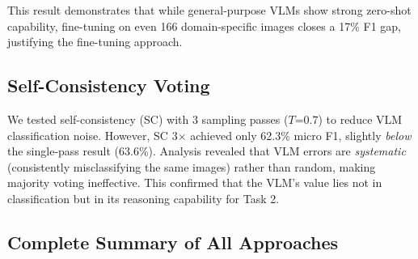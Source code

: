 \documentclass[11pt]{article}
\begin{document}
This result demonstrates that while general-purpose VLMs show strong zero-shot capability, fine-tuning on even 166 domain-specific images closes a 17\% F1 gap, justifying the fine-tuning approach.

\subsection{Self-Consistency Voting}

We tested self-consistency (SC) \cite{wang2022sc} with 3 sampling passes ($T$=0.7) to reduce VLM classification noise. However, SC 3$\times$ achieved only 62.3\% micro F1, slightly \textit{below} the single-pass result (63.6\%). Analysis revealed that VLM errors are \textit{systematic} (consistently misclassifying the same images) rather than random, making majority voting ineffective. This confirmed that the VLM's value lies not in classification but in its reasoning capability for Task 2.

\subsection{Complete Summary of All Approaches}
\end{document}
